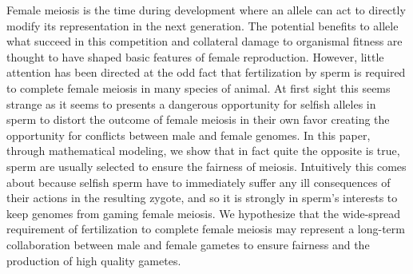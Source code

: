 \documentclass{article}
\begin{document}
Female meiosis is the time during development where an allele can act to directly modify its representation in the next generation. 
The potential benefits to allele what succeed in this competition and collateral damage to organismal fitness are thought to have shaped basic features of female reproduction. 
However, little attention has been directed at the odd fact that fertilization by sperm is required to complete female meiosis in many species of animal. 
At first sight this seems strange as it seems to presents a dangerous opportunity for selfish alleles in sperm to distort the outcome of female meiosis in their own favor creating the opportunity for conflicts between male and female genomes. 
In this paper, through mathematical modeling, we show that in fact quite the opposite is true, sperm are usually selected to ensure the fairness of meiosis. 
Intuitively this comes about because selfish sperm have to immediately suffer any ill consequences of their actions in the resulting zygote, and so it is strongly in sperm's interests to keep genomes from gaming female meiosis. 
We hypothesize that the wide-spread requirement of fertilization to complete female meiosis may represent a long-term collaboration between male and female gametes to ensure fairness and the production of high quality gametes.
\end{document}
